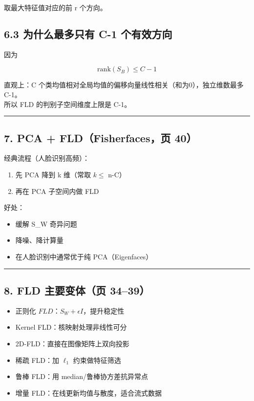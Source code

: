 \documentclass[
]{article}
\providecommand{\tightlist}{%
  \setlength{\itemsep}{0pt}\setlength{\parskip}{0pt}}
\begin{document}
{{取最大特征值对应的前 r 个方向。

\subsection{6.3 为什么最多只有 C-1
个有效方向}\label{ux4e3aux4ec0ux4e48ux6700ux591aux53eaux6709-c-1-ux4e2aux6709ux6548ux65b9ux5411}

因为

\[
\mathrm{rank}(S_B)\le C-1
\]

直观上：C 个类均值相对全局均值的偏移向量线性相关（和为0），独立维数最多
C-1。\\
所以 FLD 的判别子空间维度上限是 C-1。

\begin{center}\rule{0.5\linewidth}{0.5pt}\end{center}

\subsection{7. PCA + FLD（Fisherfaces，页
40）}\label{pca-fldfisherfacesux9875-40}

经典流程（人脸识别高频）：

\begin{enumerate}
\def\labelenumi{\arabic{enumi}.}
\tightlist
\item
  先 PCA 降到 k 维（常取 \(k\le\) n-C）\\
\item
  再在 PCA 子空间内做 FLD
\end{enumerate}

好处：

\begin{itemize}
\tightlist
\item
  缓解 S\_W 奇异问题
\item
  降噪、降计算量
\item
  在人脸识别中通常优于纯 PCA（Eigenfaces）
\end{itemize}

\begin{center}\rule{0.5\linewidth}{0.5pt}\end{center}

\subsection{8. FLD 主要变体（页
34--39）}\label{fld-ux4e3bux8981ux53d8ux4f53ux9875-3439}

\begin{itemize}
\tightlist
\item
  正则化 \(FLD\)：\(S_W+\epsilon I\)，提升稳定性
\item
  Kernel FLD：核映射处理非线性可分
\item
  2D-FLD：直接在图像矩阵上双向投影
\item
  稀疏 FLD：加 \(\ell_1\) 约束做特征筛选
\item
  鲁棒 FLD：用 median/鲁棒协方差抗异常点
\item
  增量 FLD：在线更新均值与散度，适合流式数据
\end{itemize}

}}
\end{document}
